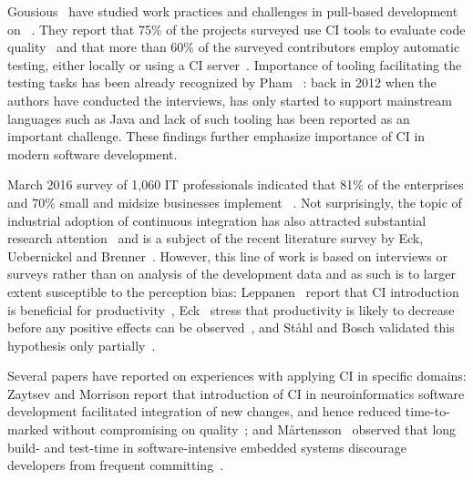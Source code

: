 Gousious \etal\ have studied work practices and challenges in pull-based
development on \GH~\cite{gousios2015work, gousios2016work}. 
They report that 75\% of the projects surveyed use CI tools to evaluate
code quality~\cite{gousios2015work} and that more than 60\% of the surveyed 
contributors employ automatic testing, either locally or using a CI server~\cite{gousios2016work}. 
Importance of tooling facilitating the testing tasks has been already recognized by 
Pham \etal~\cite{pham2013creating}: back in 2012 when the authors have conducted
the interviews, \Tvis has only started to support mainstream languages such as Java 
and lack of such tooling has been reported as an important challenge.
These findings further emphasize importance of CI in modern software development. 

March 2016 survey of 1,060 IT professionals indicated that 81\% of the enterprises 
and 70\% small and midsize businesses implement \DO~\cite{rightscale}. 
Not surprisingly, the topic of industrial adoption of continuous integration 
has also attracted substantial research attention~\cite{hilton2016continuous,Leppanen2015,Laukkanen2015Agile,Debbiche2014,Stahl2014ICSEComp,Stahl2014JSS,Stahl2013Experienced} and is a subject of the recent literature survey by Eck, Uebernickel and Brenner~\cite{EckUB14}. 
However, this line of work is based on interviews or surveys rather than on analysis of the development data
and as such is to larger extent susceptible to the perception bias: \eg Leppanen \etal\ report that
CI introduction is beneficial for productivity~\cite{Leppanen2015}, 
Eck \etal\ stress that productivity is likely to decrease before any positive effects can be observed~\cite{EckUB14},
and St{\aa}hl and Bosch validated this hypothesis only partially~\cite{Stahl2013Experienced}.

Several papers have reported on experiences with applying CI in specific domains:
\eg Zaytsev and Morrison report that introduction of CI in neuroinformatics
software development facilitated integration of new changes, and hence reduced 
time-to-marked without compromising on quality~\cite{Zaytsev:Morrison}; 
and M{\aa}rtensson \etal\ observed that long build- and test-time in software-intensive
embedded systems discourage developers from frequent committing~\cite{Martensson2016}.


